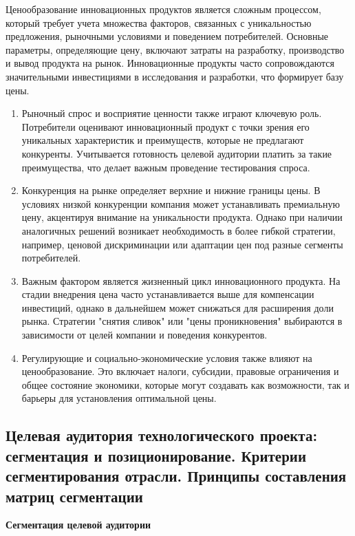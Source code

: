 Ценообразование инновационных продуктов является сложным процессом, который требует учета множества факторов, связанных с уникальностью предложения, рыночными условиями и поведением потребителей. Основные параметры, определяющие цену, включают затраты на разработку, производство и вывод продукта на рынок. Инновационные продукты часто сопровождаются значительными инвестициями в исследования и разработки, что формирует базу цены.

\begin{enumerate}
    \item Рыночный спрос и восприятие ценности также играют ключевую роль. Потребители оценивают инновационный продукт с точки зрения его уникальных характеристик и преимуществ, которые не предлагают конкуренты. Учитывается готовность целевой аудитории платить за такие преимущества, что делает важным проведение тестирования спроса.
    \item Конкуренция на рынке определяет верхние и нижние границы цены. В условиях низкой конкуренции компания может устанавливать премиальную цену, акцентируя внимание на уникальности продукта. Однако при наличии аналогичных решений возникает необходимость в более гибкой стратегии, например, ценовой дискриминации или адаптации цен под разные сегменты потребителей.
    \item Важным фактором является жизненный цикл инновационного продукта. На стадии внедрения цена часто устанавливается выше для компенсации инвестиций, однако в дальнейшем может снижаться для расширения доли рынка. Стратегии "снятия сливок" или "цены проникновения" выбираются в зависимости от целей компании и поведения конкурентов.
    \item Регулирующие и социально-экономические условия также влияют на ценообразование. Это включает налоги, субсидии, правовые ограничения и общее состояние экономики, которые могут создавать как возможности, так и барьеры для установления оптимальной цены.
\end{enumerate}

\pagebreak

\subsection{Целевая аудитория технологического проекта: сегментация и позиционирование. Критерии сегментирования отрасли. Принципы составления матриц сегментации}

\textbf{Сегментация целевой аудитории}

